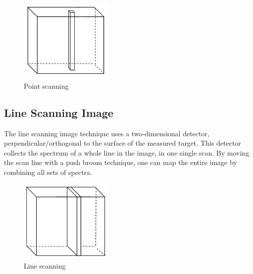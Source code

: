 \begin{figure}[H]
\centering
  \includegraphics[height=4cm]{Images/theory/voxel.png}
  \caption[Point Scanning]{Point scanning}
  \label{fig:voxel2}
\end{figure}


\subsection{Line Scanning Image} \label{sec:push}
The line scanning image technique uses a two-dimensional detector, perpendicular/orthogonal to the surface of the measured target. This detector collects the spectrum of a whole line in the image, in one single scan. By moving the scan line with a push broom technique, one can map the entire image by combining all sets of spectra. \cite{hia}


\begin{figure}[H]
\centering
  \includegraphics[height=4cm]{Images/theory/pushbroom.png}
  \caption[Line Scanning]{Line scanning}
  \label{fig:pushbroom}
\end{figure}

